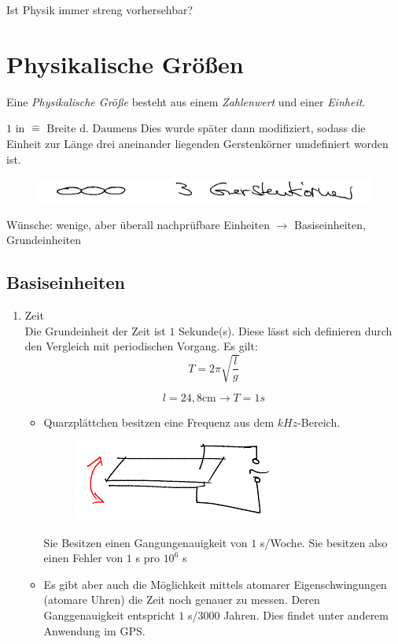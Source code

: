 \documentclass[a4paper,10pt]{scrartcl}
\begin{document}
\begin{seg}{Ist Physik immer streng vorhersehbar?}
\section{Physikalische Größen}
Eine \emph{Physikalische Größe} besteht aus einem \emph{Zahlenwert} und einer \emph{Einheit}.
\begin{ex*}
$1 \text{ in } \hat = \text{ Breite d. Daumens}$
Dies wurde später dann modifiziert, sodass die Einheit zur Länge drei aneinander liegenden Gerstenkörner umdefiniert worden ist.
\begin{figure}[h]
\includegraphics[scale=0.5]{fig4.png}
 \end{figure}
 
 Wünsche: wenige, aber überall nachprüfbare Einheiten $\rightarrow$ Basiseinheiten, Grundeinheiten
 \end{ex*}
 \end{seg}
 \subsection{Basiseinheiten}
 \begin{enumerate}[a]
\item Zeit \\
Die Grundeinheit der Zeit ist $1$ Sekunde(s).  Diese lässt sich definieren durch den Vergleich mit periodischen Vorgang. Es gilt:
\[
T=2\pi \sqrt{\frac{l}{g}}
\]

\[
l=24,8 \text{cm} \rightarrow T=1s
\]
\begin{itemize}
\item Quarzplättchen besitzen eine Frequenz aus dem $kHz$-Bereich.
\begin{figure}[h]
\includegraphics[scale=0.5]{fig5.png}
\end{figure}

Sie Besitzen einen Gangungenauigkeit von $1$ s/Woche. Sie besitzen also einen Fehler von $1$ s pro $10^6$ s
\item Es gibt aber auch die Möglichkeit mittels atomarer Eigenschwingungen (atomare Uhren) die Zeit noch genauer zu messen.  Deren Ganggenauigkeit entspricht $1$ s/$3000$ Jahren. Dies findet unter anderem Anwendung im GPS. 
\end{itemize}
\end{enumerate}
\end{document}
